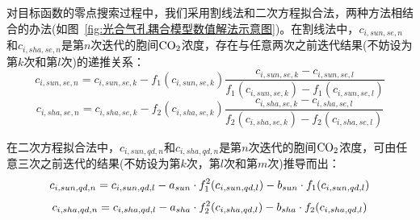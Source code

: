 对目标函数的零点搜索过程中，我们采用割线法和二次方程拟合法，两种方法相结合的办法(如图~\ref{fig:光合气孔耦合模型数值解法示意图})。在割线法中，$c_{i,sun,se,n}$和$c_{i,sha,se,n}$是第$n$次迭代的胞间$\rm CO_2$浓度，存在与任意两次之前迭代结果(不妨设为第$k$次和第$l$次)的递推关系：
\begin{equation}\label{cisunn}
c_{i,sun,se,n}=c_{i,sun,se,k}-f_{1}\left(c_{i,sun,se,k}\right)\frac{c_{i,sun,se,k}-c_{i,sun,se,l}}{ f_{1}\left(c_{i,sun,se,k}\right)-f_{1}\left(c_{i,sun,se,l}\right)} 
\end{equation}
\begin{equation}\label{cishan}
c_{i,sha,se,n}=c_{i,sha,se,k}-f_{2}\left(c_{i,sha,se,k}\right)\frac{c_{i,sha,se,k}-c_{i,sha,se,l}}{ f_{2}\left(c_{i,sha,se,k}\right)-f_{2}\left(c_{i,sha,se,l}\right)} 
\end{equation}

在二次方程拟合法中，$c_{i,sun,qd,n}$和$c_{i,sha,qd,n}$是第$n$次迭代的胞间$\rm CO_2$浓度，可由任意三次之前迭代的结果(不妨设为第$k$次，第$l$次和第$m$次)推导而出：
\begin{equation}\label{cisunq}
c_{i,sun,qd,n} =c_{i,sun,qd,l} \\
  -a_{sun}\cdot f^2_{1}(c_{i,sun,qd,l}) - b_{sun}\cdot f_{1}(c_{i,sun,qd,l})
\end{equation}
\begin{equation}\label{cishaq}
c_{i,sha,qd,n} =c_{i,sha,qd,l} \\
  -a_{sha}\cdot f^2_{2}(c_{i,sha,qd,l}) - b_{sha}\cdot f_{2}(c_{i,sha,qd,l})
\end{equation}

